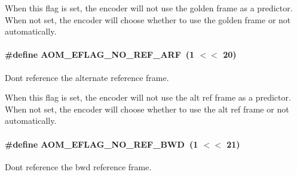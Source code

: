 When this flag is set, the encoder will not use the golden frame as a predictor. When not set, the encoder will choose whether to use the golden frame or not automatically. 
\paragraph[{\texorpdfstring{A\+O\+M\+\_\+\+E\+F\+L\+A\+G\+\_\+\+N\+O\+\_\+\+R\+E\+F\+\_\+\+A\+RF}{AOM_EFLAG_NO_REF_ARF}}]{\setlength{\rightskip}{0pt plus 5cm}\#define A\+O\+M\+\_\+\+E\+F\+L\+A\+G\+\_\+\+N\+O\+\_\+\+R\+E\+F\+\_\+\+A\+RF~(1 $<$$<$ 20)}\hypertarget{group__aom__encoder_ga9e2f989737d63ddf4e987a525d186a46}{}\label{group__aom__encoder_ga9e2f989737d63ddf4e987a525d186a46}


Don\textquotesingle{}t reference the alternate reference frame. 

When this flag is set, the encoder will not use the alt ref frame as a predictor. When not set, the encoder will choose whether to use the alt ref frame or not automatically. 
\paragraph[{\texorpdfstring{A\+O\+M\+\_\+\+E\+F\+L\+A\+G\+\_\+\+N\+O\+\_\+\+R\+E\+F\+\_\+\+B\+WD}{AOM_EFLAG_NO_REF_BWD}}]{\setlength{\rightskip}{0pt plus 5cm}\#define A\+O\+M\+\_\+\+E\+F\+L\+A\+G\+\_\+\+N\+O\+\_\+\+R\+E\+F\+\_\+\+B\+WD~(1 $<$$<$ 21)}\hypertarget{group__aom__encoder_ga758649aa6cd9fefb15ad888489884a38}{}\label{group__aom__encoder_ga758649aa6cd9fefb15ad888489884a38}


Don\textquotesingle{}t reference the bwd reference frame. 

